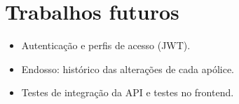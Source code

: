\documentclass[11pt,a4paper]{article}
\begin{document}
\section{Trabalhos futuros}

\begin{itemize}
  \item Autenticação e perfis de acesso (JWT).
  \item Endosso: histórico das alterações de cada apólice.
  \item Testes de integração da API e testes no frontend.
\end{itemize}
\end{document}
